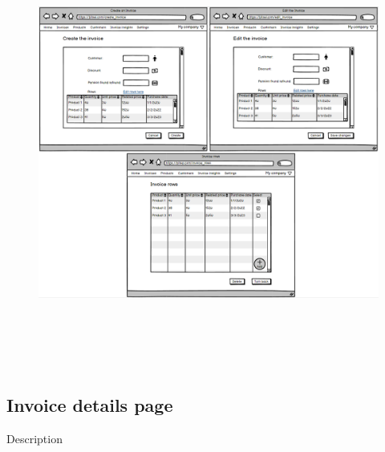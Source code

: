 \begin{figure}[h!]
    \centering
    \includegraphics[height=400pt, keepaspectratio]{resources/mockup/Invoice.png}
\end{figure}
\newpage
\subsection{Invoice details page}

Description

